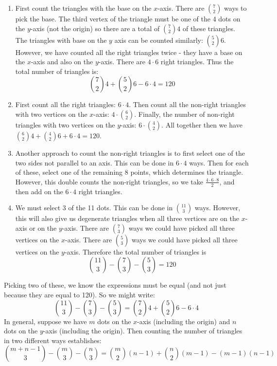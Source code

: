 \documentclass[10pt]{exam}
\begin{document}
\begin{questions}
\begin{solution}
   \begin{enumerate}
     \item First count the triangles with the base on the $x$-axis.  There are ${7 \choose 2}$ ways to pick the base.  The third vertex of the triangle must be one of the 4 dots on the $y$-axis (not the origin) so there are a total of ${7 \choose 2}4$ of these triangles.  The triangles with base on the $y$ axis can be counted similarly: ${5 \choose 2}6$.  However, we have counted all the right triangles twice - they have a base on the $x$-axis and also on the $y$-axis.  There are $4 \cdot 6$ right triangles.  Thus the total number of triangles is:
     \[{7 \choose 2}4 + {5 \choose 2}6 - 6\cdot 4 = 120\]
 		\item First count all the right triangles: $6 \cdot 4$.  Then count all the non-right triangles with two vertices on the $x$-axis: $4 \cdot {6 \choose 2}$.  Finally, the number of non-right triangles with two vertices on the $y$-axis: $6 \cdot {4 \choose 2}$.  All together then we have ${6 \choose 2}4 + {4 \choose 2}6 + 6 \cdot 4 = 120$.
 		\item Another approach to count the non-right triangles is to first select one of the two sides not parallel to an axis.  This can be done in $6 \cdot 4$ ways.  Then for each of these, select one of the remaining 8 points, which determines the triangle.  However, this double counts the non-right triangles, so we take $\frac{4\cdot 6 \cdot 8}{2}$, and then add on the $6\cdot 4$ right triangles.
     \item We must select 3 of the 11 dots.  This can be done in ${11 \choose 3}$ ways.  However, this will also give us degenerate triangles when all three vertices are on the $x$-axis or on the $y$-axis.  There are ${7 \choose 3}$ ways we could have picked all three vertices on the $x$-axis.  There are ${5 \choose 3}$ ways we could have picked all three vertices on the $y$-axis.  Therefore the total number of triangles is
     \[{11 \choose 3} - {7 \choose 3} - {5 \choose 3} = 120\]
   \end{enumerate}

 	Picking two of these, we know the expressions must be equal (and not just because they are equal to 120).  So we might write:
 	\[{11 \choose 3} - {7 \choose 3} - {5 \choose 3} = {7 \choose 2}4 + {5 \choose 2}6 - 6\cdot 4\]
 	In general, suppose we have $m$ dots on the $x$-axis (including the origin) and $n$ dots on the $y$-axis (including the origin).  Then counting the number of triangles in two different ways establishes:
 	\[{m+n-1 \choose 3} - {m \choose 3} - {n \choose 3} = {m \choose 2}(n-1) + {n \choose 2}(m-1) - (m-1)(n-1)\]
 \end{solution}






\end{questions}
\end{document}
